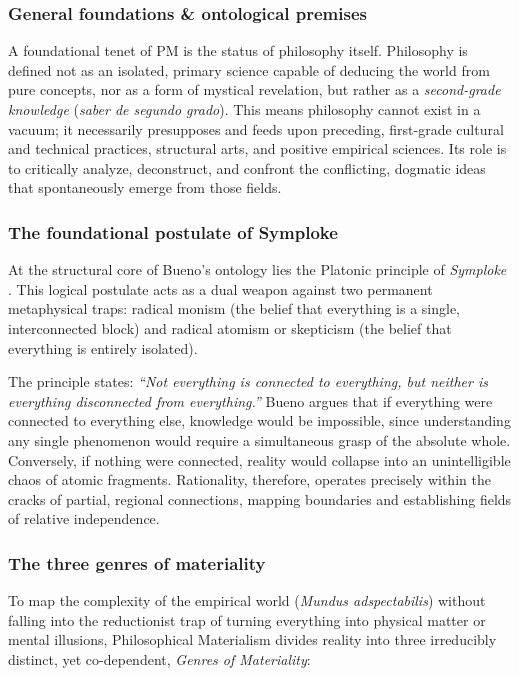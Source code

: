 \documentclass[11pt, a4paper]{article}
\begin{document}



\subsubsection*{General foundations \&  ontological premises}

A foundational tenet of PM is the status of philosophy itself. Philosophy is defined not as an isolated, primary science capable of deducing the world from pure concepts, nor as a form of mystical revelation, but rather as a \textit{second-grade knowledge} (\emph{saber de segundo grado}). This means philosophy cannot exist in a vacuum; it necessarily presupposes and feeds upon preceding, first-grade cultural and technical practices, structural arts, and positive empirical sciences. Its role is to critically analyze, deconstruct, and confront the conflicting, dogmatic ideas that spontaneously emerge from those fields.

\subsubsection*{The foundational postulate of Symploke}
At the structural core of Bueno's ontology lies the Platonic principle of {\emph{Symploke}} \cite{plato1993sophist}. This logical postulate acts as a dual weapon against two permanent metaphysical traps: radical monism (the belief that everything is a single, interconnected block) and radical atomism or skepticism (the belief that everything is entirely isolated).

The principle states: \emph{``Not everything is connected to everything, but neither is everything disconnected from everything.''} Bueno argues that if everything were connected to everything else, knowledge would be impossible, since understanding any single phenomenon would require a simultaneous grasp of the absolute whole. Conversely, if nothing were connected, reality would collapse into an unintelligible chaos of atomic fragments. Rationality, therefore, operates precisely within the cracks of partial, regional connections, mapping boundaries and establishing fields of relative independence.

\subsubsection{The three genres of materiality}
To map the complexity of the empirical world (\emph{Mundus adspectabilis}) without falling into the reductionist trap of turning everything into physical matter or mental illusions, Philosophical Materialism divides reality into three irreducibly distinct, yet co-dependent, \textit{Genres of Materiality}:
\end{document}
